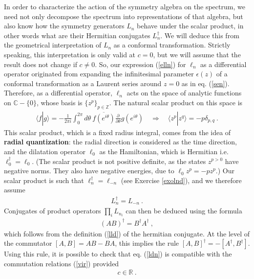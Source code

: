 \documentclass[12pt,a4paper,notitlepage]{report}
\newcommand \Z {\mathbb{Z}}
\newcommand \R {\mathbb{R}}
\newcommand \C {\mathbb{C}}
\newcommand \p {\partial}
\newcommand \pp[1] {{\frac{\p}{\p #1}}}
\numberwithin{equation}{section}
\newcommand{\term}[1]{\textbf{\boldmath #1}\index{#1}}
\theoremstyle{break}
\begin{document}
In order to characterize the action of the symmetry algebra on the spectrum, we need not only decompose the spectrum into representations of that algebra, but also know how the symmetry generators $L_n$ behave under the scalar product, in other words what are their Hermitian conjugates $L_n^\dagger$.
We will deduce this from the geometrical interpretation of $L_n$ as a conformal transformation.
Strictly speaking, this interpretation is only valid at $c=0$, but we will assume that the result does not change if $c\neq 0$.
So, our expression (\ref{elln}) for $\ell_n$ as a differential operator originated from expanding the infinitesimal parameter $\epsilon(z)$ of a conformal transformation as a Laurent series around $z=0$ as in eq. (\ref{sen}).
Therefore, as a differential operator, $\ell_n$ acts on the space of analytic functions on $\C-\{0\}$, whose basis is $\{z^p\}_{p\in\Z}$.
The natural scalar product on this space is 
\begin{align}
 \langle f|g\rangle = -\frac{1}{2\pi i}\int_0^{2\pi}d\theta\  \overline{f(e^{i\theta})} \pp{\theta} g(e^{i\theta}) \quad \Rightarrow \quad \langle z^p| z^q \rangle = -p\delta_{p,q}\ .
\label{fgd}
\end{align}
This scalar product, which is a fixed radius integral, comes from the idea of \term{radial quantization}: the radial direction is considered as the time direction, and the dilatation operator $\ell_0$ as the Hamiltonian, which is Hermitian i.e. $\ell_0^\dagger = \ell_0$. (The scalar product is not positive definite, as the states $z^{p>0}$ have negative norms.
They also have negative energies, due to $\ell_0 z^p = -pz^p$.) Our scalar product is such that $\ell_n^\dagger = \ell_{-n}$ (see Exercise \ref{exolnd}), and we therefore assume
\begin{align}
 \boxed{L^\dagger_n = L_{-n}} \ .
\label{ldn}
\end{align}
Conjugates of product operators $\prod_i L_{n_i}$ can then be deduced using the formula
\begin{align}
 (AB)^\dagger = B^\dagger A^\dagger\ , 
\label{abba}
\end{align}
which follows from the definition (\ref{lld}) of the hermitian conjugate.
At the level of the commutator $[A,B]=AB-BA$, this implies
the rule $[A,B]^\dagger = -[A^\dagger,B^\dagger]$. 
Using this rule, it is possible to check that eq. (\ref{ldn}) is compatible with the commutation relations (\ref{vir}) provided
\begin{align}
 c\in \R\ .
\label{cir}
\end{align}
\end{document}
